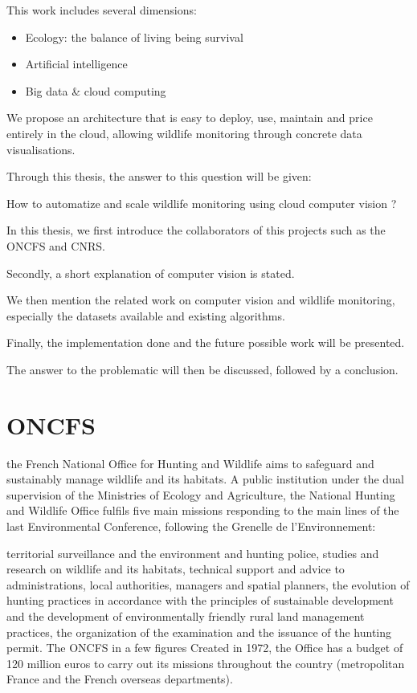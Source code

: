 This work includes several dimensions: 
\begin{itemize}
    \item Ecology: the balance of living being survival
    \item Artificial intelligence
    \item Big data \& cloud computing
\end{itemize}

We propose an architecture that is easy to deploy, use, maintain and price entirely in the cloud, allowing wildlife monitoring through concrete data visualisations.

Through this thesis, the answer to this question will be given:

\begin{it}  
How to automatize and scale wildlife monitoring using cloud computer vision ?
\end{it}


In this thesis, we first introduce the collaborators of this projects such as the ONCFS and CNRS.

Secondly, a short explanation of computer vision is stated.

We then mention the related work on computer vision and wildlife monitoring, especially the datasets available and existing algorithms.

Finally, the implementation done and the future possible work will be presented.

The answer to the problematic will then be discussed, followed by a conclusion.




\pagebreak\section{ONCFS}
the French National Office for Hunting and Wildlife aims to safeguard and sustainably manage wildlife and its habitats.
A public institution under the dual supervision of the Ministries of Ecology and Agriculture, the National Hunting and Wildlife Office fulfils five main missions responding to the main lines of the last Environmental Conference, following the Grenelle de l'Environnement:

territorial surveillance and the environment and hunting police,
studies and research on wildlife and its habitats,
technical support and advice to administrations, local authorities, managers and spatial planners,
the evolution of hunting practices in accordance with the principles of sustainable development and the development of environmentally friendly rural land management practices,
the organization of the examination and the issuance of the hunting permit. 
The ONCFS in a few figures
Created in 1972, the Office has a budget of 120 million euros to carry out its missions throughout the country (metropolitan France and the French overseas departments). 

